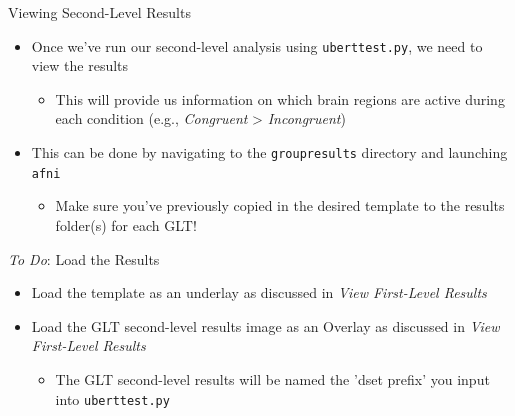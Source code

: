 \documentclass[t,12pt]{beamer}
\begin{document}
\begin{frame}{Viewing Second-Level Results}
\vspace{10pt}
\begin{itemize}
\setlength\itemsep{1em}
\item Once we've run our second-level analysis using \texttt{uber\textunderscore{}ttest.py}, we need to view the results
\vspace{4pt}
\begin{itemize}
\item This will provide us information on which brain regions are active during each condition (e.g., \textit{Congruent} > \textit{Incongruent})
\end{itemize}
\item This can be done by navigating to the \texttt{group\textunderscore{}results} directory and launching \texttt{afni}
\vspace{4pt}
\begin{itemize}
\item Make sure you've previously copied in the desired template to the results folder(s) for each GLT!
\end{itemize}
\end{itemize}
\end{frame}

\begin{frame}{\emph{To Do}: Load the Results}
\vspace{10pt}
\begin{itemize}
\setlength\itemsep{1em}
\item Load the template as an underlay as discussed in \textit{View First-Level Results}
\item Load the GLT second-level results image as an Overlay as discussed in \textit{View First-Level Results}
\vspace{4pt}
\begin{itemize}
\item The GLT second-level results will be named the 'dset prefix' you input into \texttt{uber\textunderscore{}ttest.py}
\end{itemize}
\end{itemize}
\end{frame}
\end{document}
